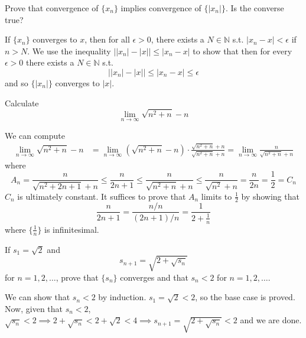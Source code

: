 \documentclass{article}
\begin{document}
    \begin{exercise}
    Prove that convergence of $\{x_n\}$ implies convergence of $\{|x_n|\}$. Is the converse true? 
    \end{exercise}
    \begin{solution}
    If $\{x_n\}$ converges to $x$, then for all $\epsilon > 0$, there exists a $N \in \mathbb{N}$ s.t. $|x_n - x| < \epsilon$ if $n > N$. We use the inequality $\big| |x_n| - |x| \big| \leq |x_n - x|$ to show that then for every $\epsilon > 0$ there exists a $N \in \mathbb{N}$ s.t. 
    \[ \big| |x_n| - |x| \big| \leq |x_n - x| \leq \epsilon \]
    and so $\{|x_n|\}$ converges to $|x|$. 
    \end{solution}

    \begin{exercise}
    Calculate 
    \[\lim_{n \rightarrow \infty} \sqrt{n^2 + n} - n\]
    \end{exercise}
    \begin{solution}
    We can compute  
    \begin{align*}
        \lim_{n \rightarrow \infty} \sqrt{n^2 + n} - n & = \lim_{n \rightarrow \infty} (\sqrt{n^2 + n} - n) \cdot \frac{\sqrt{n^2 + n} + n}{\sqrt{n^2 + n} + n} = \lim_{n \rightarrow \infty} \frac{n}{\sqrt{n^2 + n} + n}
    \end{align*}
    where 
    \[A_n = \frac{n}{\sqrt{n^2 + 2n + 1} + n} \leq \frac{n}{2n + 1} \leq \frac{n}{\sqrt{n^2 + n} + n} \leq \frac{n}{\sqrt{n^2} + n} = \frac{n}{2n} = \frac{1}{2} = C_n\]
    $C_n$ is ultimately constant. It suffices to prove that $A_n$ limits to $\frac{1}{2}$ by showing that 
    \[\frac{n}{2n + 1} = \frac{n/n}{(2n+1)/n} = \frac{1}{2 + \frac{1}{n}}\]
    where $\{\frac{1}{n}\}$ is infinitesimal. 
    \end{solution}

    \begin{exercise}[Rudin 3.3]
    If $s_1 = \sqrt{2}$ and 
    \[s_{n+1} = \sqrt{2 + \sqrt{s_n}}\]
    for $n = 1, 2, \ldots$, prove that $\{s_n\}$ converges and that $s_n < 2$ for $n = 1, 2, \ldots$. 
    \end{exercise}
    \begin{solution}
    We can show that $s_n < 2$ by induction. $s_1 = \sqrt{2} < 2$, so the base case is proved. Now, given that $s_n < 2$, $\sqrt{s_n} < 2 \implies 2 + \sqrt{s_n} < 2 + \sqrt{2} < 4 \implies s_{n+1} = \sqrt{2 + \sqrt{s_n}} < 2$ and we are done. 
    \end{solution}

    \begin{exercise}[Rudin 3.4]

    \end{exercise}
\end{document}
